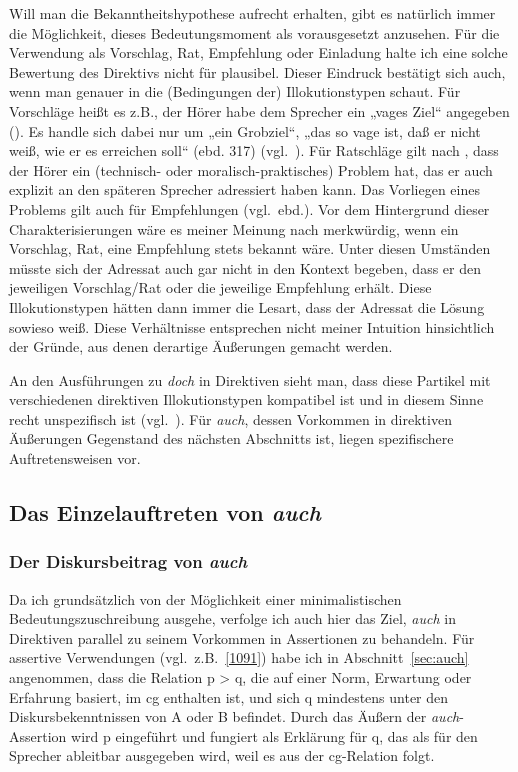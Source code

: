 Will man die Bekanntheitshypothese aufrecht erhalten, gibt es natürlich immer die Möglichkeit, dieses Bedeutungsmoment als vorausgesetzt anzusehen. Für die Verwendung als Vorschlag, Rat, Empfehlung oder Einladung halte ich eine solche Bewertung des Direktivs nicht für plausibel. Dieser Eindruck bestätigt sich auch, wenn man genauer in die (Bedingungen der) Illokutionstypen schaut. Für Vorschläge  heißt es z.B., der Hörer habe dem Sprecher ein „vages Ziel“ angegeben (\citealt[319]{Rehbein1977}). Es handle sich dabei nur um „ein Grobziel“, „das so vage ist, daß er nicht weiß, wie er es erreichen soll“ (ebd. 317) (vgl.\ \citealt[186]{Rolf1997}). Für Ratschläge  gilt nach \citet[186--187]{Rolf1997}, dass der Hörer ein (technisch- oder moralisch-praktisches) Problem hat, das er auch explizit an den späteren Sprecher adressiert haben kann. Das Vorliegen eines Problems gilt auch für Empfehlungen (vgl.\ ebd.). Vor dem Hintergrund dieser Charakterisierungen wäre es meiner Meinung nach merkwürdig, wenn ein Vorschlag, Rat, eine Empfehlung stets bekannt wäre. Unter diesen Umständen müsste sich der Adressat auch gar nicht in den Kontext begeben, dass er den jeweiligen Vorschlag/Rat oder die jeweilige Empfehlung erhält. Diese Illokutions\-typen hätten dann immer die Lesart, dass der Adressat die Lösung sowieso weiß. Diese Verhältnisse entsprechen nicht meiner Intuition hinsichtlich der Gründe, aus denen derartige Äußerungen gemacht werden.  

An den Ausführungen zu \textit{doch} in Direktiven sieht man, dass diese Partikel mit verschiedenen direktiven Illokutionstypen  kompatibel ist und in diesem Sinne recht unspezifisch ist (vgl.\ \citealt[119]{Thurmair1989}). Für \textit{auch}, dessen Vorkommen in direktiven Äußerungen Gegenstand des nächsten Abschnitts ist, liegen spezifi\-schere Auftretensweisen vor.

\subsection{Das Einzelauftreten von \textit{auch}} 
\label{sec:dadir}
\subsubsection{Der Diskursbeitrag von \textit{auch}}
Da ich grundsätzlich von der Möglichkeit einer minimalistischen Bedeutungszuschreibung  ausgehe, verfolge ich auch hier das Ziel, \textit{auch} in Direktiven parallel zu seinem Vorkommen in Assertionen zu behandeln. Für assertive Verwendungen (vgl.\ z.B.\ \ref{1091}) habe ich in Abschnitt~\ref{sec:auch} angenommen, dass die Relation p > q, die auf einer Norm, Erwartung oder Erfahrung basiert, im cg enthalten ist, und sich q mindestens unter den Diskursbekenntnissen von A oder B befindet. Durch das Äußern der \textit{auch}-Assertion wird p eingeführt und fungiert als Erklärung für q, das als für den Sprecher ableitbar ausgegeben wird, weil es aus der cg-Relation folgt.
	
